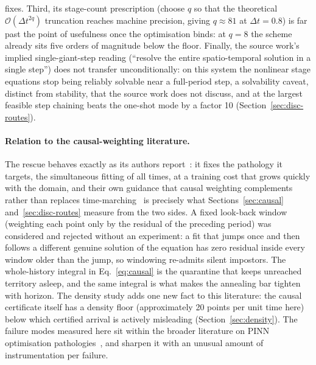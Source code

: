 \documentclass[11pt,a4paper]{article}
\begin{document}
fixes. Third, its stage-count prescription (choose $q$ so that the
theoretical $\mathcal{O}(\Delta t^{2q})$ truncation reaches machine
precision, giving $q \approx 81$ at $\Delta t = 0.8$) is far past the
point of usefulness once the optimisation binds: at $q = 8$ the scheme
already sits five orders of magnitude below the floor. Finally, the
source work's implied single-giant-step reading (``resolve the entire
spatio-temporal solution in a single step'') does not transfer
unconditionally: on this system the nonlinear stage equations stop being
reliably solvable near a full-period step, a solvability caveat, distinct
from stability, that the source work does not discuss, and at the
largest feasible step chaining beats the one-shot mode by a factor 10
(Section~\ref{sec:disc-routes}).

\paragraph{Relation to the causal-weighting literature.}
The rescue behaves exactly as its authors report~\cite{wang2024causal}: it
fixes the pathology it targets, the simultaneous fitting of all times, at
a training cost that grows quickly with the domain, and their own guidance
that causal weighting complements rather than replaces
time-marching~\cite{wang2023expert} is precisely what
Sections~\ref{sec:causal} and~\ref{sec:disc-routes} measure from the two
sides. A fixed look-back window (weighting each point only by the residual
of the preceding period) was considered and rejected without an
experiment: a fit that jumps once and then follows a different genuine
solution of the equation has zero residual inside every window older than
the jump, so windowing re-admits silent impostors. The whole-history
integral in Eq.~\eqref{eq:causal} is the quarantine that keeps unreached
territory asleep, and the same integral is what makes the annealing bar
tighten with horizon. The density study adds one new fact to this
literature: the causal certificate itself has a density floor
(approximately 20 points per unit time here) below which certified
arrival is actively misleading (Section~\ref{sec:density}). The failure
modes measured here sit within the broader literature on PINN optimisation
pathologies~\cite{wang2021gradient,krishnapriyan2021}, and sharpen it with
an unusual amount of instrumentation per failure.
\end{document}
